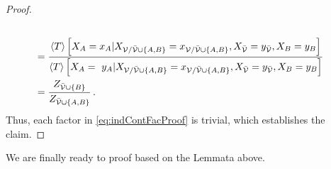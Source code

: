 \begin{proof}
\begin{align*}
{		} \\
		& = 
		\frac{
			 \sbnormationofwrt{\hypercore}{
			 	\indexedcatvariableof{\nodesa} 
			 }{\indexedcatvariableof{\nodes/\thirdnodes\cup\{\nodesa,\nodesb\}}, \catvariableof{\thirdnodes}=\seccatindexof{\thirdnodes}, \catvariableof{\nodesb} = \seccatindexof{\nodesb}} 
		}{
			 \sbnormationofwrt{\hypercore}{
			 	\catvariableof{\nodesa} = \seccatindexof{\nodesa}
			 }{\indexedcatvariableof{\nodes/\thirdnodes\cup\{\nodesa,\nodesb\}}, \catvariableof{\thirdnodes}=\seccatindexof{\thirdnodes},\catvariableof{\nodesb} = \seccatindexof{\nodesb}} 
		} \\
		& = 
		\frac{
			Z_{\thirdnodes\cup\{\nodesb\}}
		}{
			Z_{\thirdnodes\cup\{\nodesa,\nodesb\}}
		} \, . 
	\end{align*}
	Thus, each factor in \eqref{eq:indContFacProof} is trivial, which establishes the claim.
\end{proof}

We are finally ready to proof  based on the Lemmata above.

